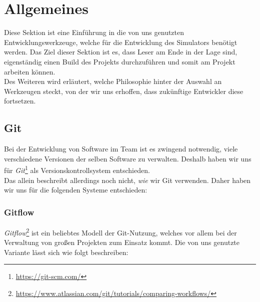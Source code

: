 
\section{Allgemeines}

Diese Sektion ist eine Einführung in die von uns genutzten Entwicklungswerkzeuge,
welche für die Entwicklung des Simulators benötigt werden. Das Ziel dieser Sektion
ist es, dass Leser am Ende in der Lage sind, eigenständig einen Build des Projekts
durchzuführen und somit am Projekt arbeiten können. \\
Des Weiteren wird erläutert, welche Philosophie hinter der Auswahl an Werkzeugen
steckt, von der wir uns erhoffen, dass zukünftige Entwickler diese fortsetzen.

\subsection{Git}
Bei der Entwicklung von Software im Team ist es zwingend notwendig, viele verschiedene Versionen
der selben Software zu verwalten. Deshalb haben wir uns für
\textit{Git}\footnote{\url{https://git-scm.com/}} als Versionskontrollsystem entschieden. \\
Das allein beschreibt allerdings noch nicht, \textit{wie} wir Git verwenden. Daher haben wir uns für
die folgenden Systeme entschieden:

\subsubsection{Gitflow}

\textit{Gitflow}\footnote{\url{https://www.atlassian.com/git/tutorials/comparing-workflows/}} ist
ein beliebtes Modell der Git-Nutzung, welches vor allem bei der Verwaltung von großen Projekten
zum Einsatz kommt. Die von uns genutzte Variante lässt sich wie folgt beschreiben:


